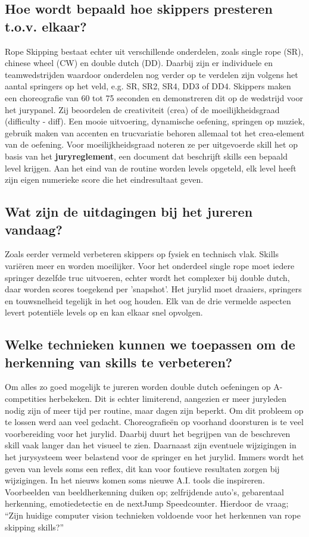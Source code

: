 \subsection{Hoe wordt bepaald hoe skippers presteren t.o.v. elkaar?}

Rope Skipping bestaat echter uit verschillende onderdelen, zoals single rope (SR), chinese wheel (CW) en double dutch (DD). Daarbij zijn er individuele en teamwedstrijden waardoor onderdelen nog verder op te verdelen zijn volgens het aantal springers op het veld, e.g. SR, SR2, SR4, DD3 of DD4. Skippers maken een choreografie van 60 tot 75 seconden en demonstreren dit op de wedstrijd voor het jurypanel. Zij beoordelen de creativiteit (crea) of de moeilijkheidsgraad (difficulty - diff). Een mooie uitvoering, dynamische oefening, springen op muziek, gebruik maken van accenten en trucvariatie behoren allemaal tot het crea-element van de oefening. Voor moeilijkheidsgraad noteren ze per uitgevoerde skill het op basis van het \textbf{juryreglement}, een document dat beschrijft skills een bepaald level krijgen. Aan het eind van de routine worden levels opgeteld, elk level heeft zijn eigen numerieke score die het eindresultaat geven.

\subsection{Wat zijn de uitdagingen bij het jureren vandaag?}

Zoals eerder vermeld verbeteren skippers op fysiek en technisch vlak. Skills variëren meer en worden moeilijker. Voor het onderdeel single rope moet iedere springer dezelfde truc uitvoeren, echter wordt het complexer bij double dutch, daar worden scores toegekend per 'snapshot'. Het jurylid moet draaiers, springers en touwsnelheid tegelijk in het oog houden. Elk van de drie vermelde aspecten levert potentiële levels op en kan elkaar snel opvolgen.

\subsection{Welke technieken kunnen we toepassen om de herkenning van skills te verbeteren?}

Om alles zo goed mogelijk te jureren worden double dutch oefeningen op A-competities herbekeken. Dit is echter limiterend, aangezien er meer juryleden nodig zijn of meer tijd per routine, maar dagen zijn beperkt.
Om dit probleem op te lossen werd aan veel gedacht. Choreografieën op voorhand doorsturen is te veel voorbereiding voor het jurylid. Daarbij duurt het begrijpen van de beschreven skill vaak langer dan het visueel te zien.
Daarnaast zijn eventuele wijzigingen in het jurysysteem weer belastend voor de springer en het jurylid. Immers wordt het geven van levels soms een reflex, dit kan voor foutieve resultaten zorgen bij wijzigingen.
In het nieuws komen soms nieuwe A.I. tools die inspireren. Voorbeelden van beeldherkenning duiken op; zelfrijdende auto's, gebarentaal herkenning, emotiedetectie en de nextJump Speedcounter. Hierdoor de vraag; ``Zijn huidige computer vision technieken voldoende voor het herkennen van rope skipping skills?''

